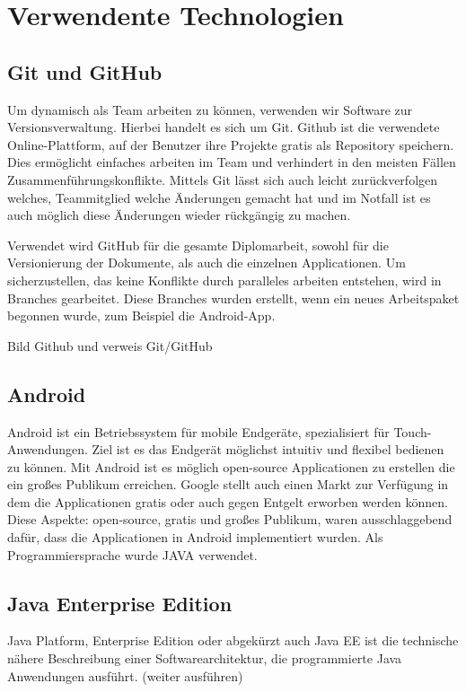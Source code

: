 \chapter{Verwendente Technologien}
\section{Git und GitHub}
Um dynamisch als Team arbeiten zu können, verwenden wir Software zur Versionsverwaltung. Hierbei handelt es sich um Git. 
Github ist die verwendete Online-Plattform, auf der Benutzer ihre Projekte gratis als Repository speichern. Dies ermöglicht einfaches arbeiten im Team und verhindert in den meisten Fällen Zusammenführungskonflikte. Mittels Git lässt sich auch leicht zurückverfolgen welches, Teammitglied welche Änderungen gemacht hat und im Notfall ist es auch möglich diese Änderungen wieder rückgängig zu machen.

Verwendet wird GitHub für die gesamte Diplomarbeit, sowohl für die Versionierung der Dokumente, als auch  die einzelnen Applicationen. Um sicherzustellen, das keine Konflikte durch paralleles arbeiten entstehen, wird in Branches gearbeitet. Diese Branches wurden erstellt, wenn ein neues Arbeitspaket begonnen wurde, zum Beispiel die Android-App.

Bild Github und verweis Git/GitHub

\section{Android}

Android ist ein Betriebssystem für mobile Endgeräte, spezialisiert für Touch-Anwendungen. Ziel ist es das Endgerät möglichst intuitiv und flexibel bedienen zu können. Mit Android ist es möglich open-source Applicationen zu erstellen die ein großes Publikum erreichen. Google stellt auch einen Markt zur Verfügung in dem die Applicationen gratis oder auch gegen Entgelt erworben werden können.
Diese Aspekte: open-source, gratis und großes Publikum, waren ausschlaggebend dafür, dass die Applicationen in Android implementiert wurden. Als Programmiersprache wurde JAVA verwendet.




\section{Java Enterprise Edition}\label{sec:javaee}
Java Platform, Enterprise Edition oder abgekürzt auch Java EE ist die technische nähere Beschreibung einer Softwarearchitektur, die programmierte Java Anwendungen ausführt.
(weiter ausführen)

